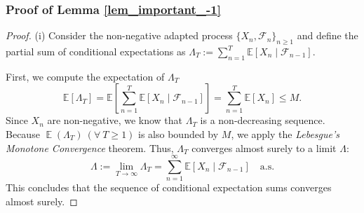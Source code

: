 \documentclass{article} %
\DeclareMathOperator{\Expect}{\mathbb{E}}
\begin{document}
\subsubsection{Proof of Lemma \ref{lem_important_-1}}
\begin{proof}
(i) Consider the non-negative adapted process \(\{X_n, \mathscr{F}_n\}_{n \geq 1}\) and define the partial sum of conditional expectations as \(\Lambda_T := \sum_{n=1}^{T} \mathbb{E}[X_n \mid \mathscr{F}_{n-1}]\). 

First, we compute the expectation of \(\Lambda_T\)
\[
\mathbb{E}[\Lambda_T] = \mathbb{E}\left[\sum_{n=1}^{T} \mathbb{E}[X_n \mid \mathscr{F}_{n-1}]\right] = \sum_{n=1}^{T} \mathbb{E}[X_n] \leq M.
\]
Since \(X_n\) are non-negative, we know that \(\Lambda_T\) is a non-decreasing sequence. Because \(\Expect(\Lambda_T)\ (\forall\ T\ge 1)\) is also bounded by $M$, we apply the \emph{Lebesgue's Monotone Convergence} theorem. Thus, \(\Lambda_T\) converges almost surely to a limit \(\Lambda\):
\[
\Lambda := \lim_{T \to \infty} \Lambda_T = \sum_{n=1}^{\infty} \mathbb{E}[X_n \mid \mathscr{F}_{n-1}] \quad \text{a.s.}
\]
This concludes that the sequence of conditional expectation sums converges almost surely.


\end{proof}
\end{document}
